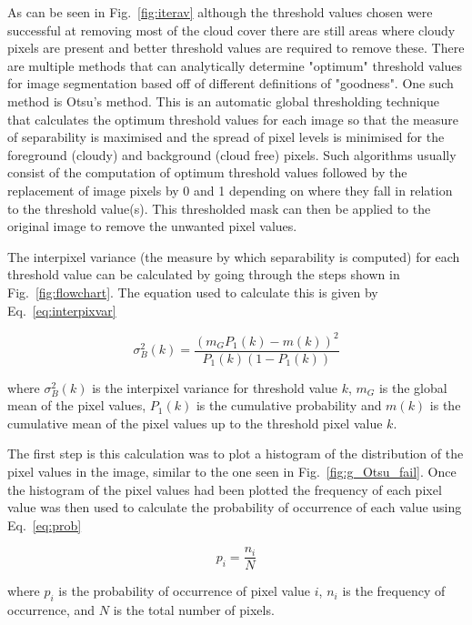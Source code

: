As can be seen in Fig.~\ref{fig:iterav} although the threshold values chosen were successful at removing most of the cloud cover there are still areas where cloudy pixels are present and better threshold values are required to remove these. There are multiple methods that can analytically determine "optimum" threshold values for image segmentation based off of different definitions of "goodness". One such method is Otsu's method. This is an automatic global thresholding technique that calculates the optimum threshold values for each image so that the measure of separability is maximised and the spread of pixel levels is minimised for the foreground (cloudy) and background (cloud free) pixels. Such algorithms usually consist of the computation of optimum threshold values followed by the replacement of image pixels by 0 and 1 depending on where they fall in relation to the threshold value(s). This thresholded mask can then be applied to the original image to remove the unwanted pixel values.

\par
The interpixel variance (the measure by which separability is computed) for each threshold value can be calculated by going through the steps shown in Fig.~\ref{fig:flowchart}. The equation used to calculate this is given by Eq.~\ref{eq:interpixvar}

\begin{equation}\label{eq:interpixvar}
\sigma_{B}^{2}(k)=\frac{\left(m_{G} P_{1}(k)-m(k)\right)^{2}}{P_{1}(k)\left(1-P_{1}(k)\right)}
\end{equation}


where $\sigma_{B}^{2}(k)$ is the interpixel variance for threshold value $k$, $m_G$ is the global mean of the pixel values, $P_{1}(k)$ is the cumulative probability and $m(k)$ is the cumulative mean of the pixel values up to the threshold pixel value $k$.
\\
\par
The first step is this calculation was to plot a histogram of the distribution of the pixel values in the image, similar to the one seen in Fig.~\ref{fig:g_Otsu_fail}. Once the histogram of the pixel values had been plotted the frequency of each pixel value was then used to calculate the probability of occurrence of each value using Eq.~\ref{eq:prob}

\begin{equation}\label{eq:prob}
p_{i}=\frac{n_{i}}{N}
\end{equation}


where $p_{i}$ is the probability of occurrence of pixel value $i$, $n_{i}$ is the frequency of occurrence, and $N$ is the total number of pixels.

